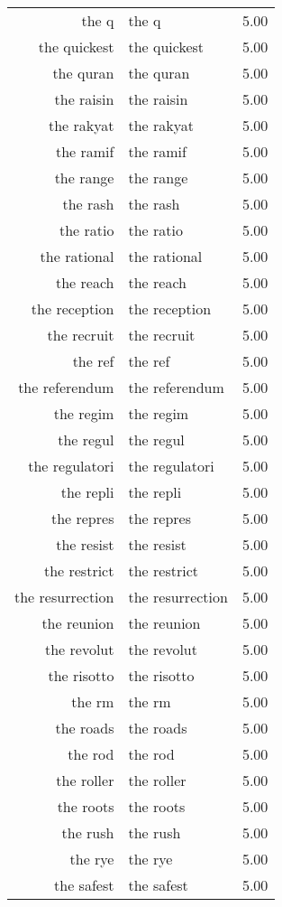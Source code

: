 \begin{table}[ht]
\begin{tabular}{rlr}
  the q & the q & 5.00 \\ 
  the quickest & the quickest & 5.00 \\ 
  the quran & the quran & 5.00 \\ 
  the raisin & the raisin & 5.00 \\ 
  the rakyat & the rakyat & 5.00 \\ 
  the ramif & the ramif & 5.00 \\ 
  the range & the range & 5.00 \\ 
  the rash & the rash & 5.00 \\ 
  the ratio & the ratio & 5.00 \\ 
  the rational & the rational & 5.00 \\ 
  the reach & the reach & 5.00 \\ 
  the reception & the reception & 5.00 \\ 
  the recruit & the recruit & 5.00 \\ 
  the ref & the ref & 5.00 \\ 
  the referendum & the referendum & 5.00 \\ 
  the regim & the regim & 5.00 \\ 
  the regul & the regul & 5.00 \\ 
  the regulatori & the regulatori & 5.00 \\ 
  the repli & the repli & 5.00 \\ 
  the repres & the repres & 5.00 \\ 
  the resist & the resist & 5.00 \\ 
  the restrict & the restrict & 5.00 \\ 
  the resurrection & the resurrection & 5.00 \\ 
  the reunion & the reunion & 5.00 \\ 
  the revolut & the revolut & 5.00 \\ 
  the risotto & the risotto & 5.00 \\ 
  the rm & the rm & 5.00 \\ 
  the roads & the roads & 5.00 \\ 
  the rod & the rod & 5.00 \\ 
  the roller & the roller & 5.00 \\ 
  the roots & the roots & 5.00 \\ 
  the rush & the rush & 5.00 \\ 
  the rye & the rye & 5.00 \\ 
  the safest & the safest & 5.00 \\ 

\end{tabular}
\end{table}
